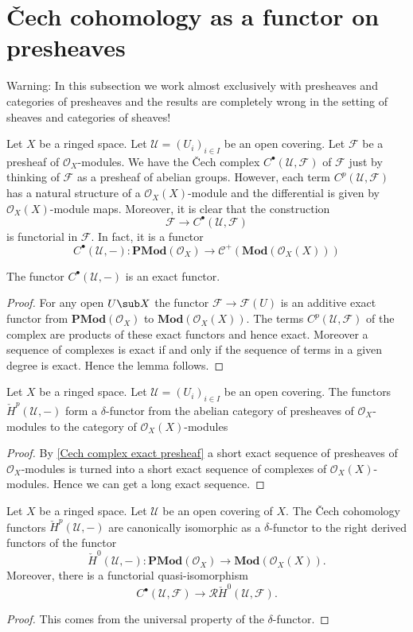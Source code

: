 \section{\v{C}ech cohomology as a functor on presheaves}
Warning: In this subsection we work almost exclusively with presheaves and categories of presheaves and the results are completely wrong in the setting of sheaves and categories of sheaves!\par
Let $X$ be a ringed space. Let $\mathcal{U}=(U_i)_{i\in I}$ be an open covering. Let $\mathscr{F}$ be a presheaf of $\mathscr{O}_X$-modules. We have the \v{C}ech complex $C^\bullet(\mathcal{U},\mathscr{F})$ of $\mathscr{F}$ just by thinking of $\mathscr{F}$ as a presheaf of abelian groups. However, each term $C^p(\mathcal{U},\mathscr{F})$ has a natural structure of a $\mathscr{O}_X(X)$-module and the differential is given by $\mathscr{O}_X(X)$-module maps. Moreover, it is clear that the construction
\[\mathscr{F}\to C^\bullet(\mathcal{U},\mathscr{F})\]
is functorial in $\mathscr{F}$. In fact, it is a functor
\[C^\bullet(\mathcal{U},-):\mathbf{PMod}(\mathscr{O}_X)\to\mathcal{C}^+(\mathbf{Mod}(\mathscr{O}_X(X)))\]
\begin{proposition}\label{Cech complex exact presheaf}
The functor $C^\bullet(\mathcal{U},-)$ is an exact functor.
\end{proposition}
\begin{proof}
For any open $U\sub X$ the functor $\mathscr{F}\to\mathscr{F}(U)$ is an additive exact functor from $\mathbf{PMod}(\mathscr{O}_X)$ to $\mathbf{Mod}(\mathscr{O}_X(X))$. The terms $C^p(\mathcal{U},\mathscr{F})$ of the complex are products of these exact functors and hence exact. Moreover a sequence of complexes is exact if and only if the sequence of terms in a given degree is exact. Hence the lemma follows.
\end{proof}
\begin{theorem}\label{Cech presheaf delta functor}
Let $X$ be a ringed space. Let $\mathcal{U}=(U_i)_{i\in I}$ be an open covering. The functors $\check{H}^p(\mathcal{U},-)$ form a $\delta$-functor from the abelian category of presheaves of $\mathscr{O}_X$-modules to the category of $\mathscr{O}_X(X)$-modules
\end{theorem}
\begin{proof}
By \cref{Cech complex exact presheaf} a short exact sequence of presheaves of $\mathscr{O}_X$-modules is turned into a short exact sequence of complexes of $\mathscr{O}_X(X)$-modules. Hence we can get a long exact sequence.
\end{proof}
\begin{proposition}
Let $X$ be a ringed space. Let $\mathcal{U}$ be an open covering of $X$. The \v{C}ech cohomology functors $\check{H}^p(\mathcal{U},-)$ are canonically isomorphic as a $\delta$-functor to the right derived functors of the functor 
\[\check{H}^0(\mathcal{U},-):\mathbf{PMod}(\mathscr{O}_X)\to\mathbf{Mod}(\mathscr{O}_X(X)).\]
Moreover, there is a functorial quasi-isomorphism
\[C^\bullet(\mathcal{U},\mathscr{F})\to\mathcal{R}\check{H}^0(\mathcal{U},\mathscr{F}).\]
\end{proposition}
\begin{proof}
This comes from the universal property of the $\delta$-functor.
\end{proof}
